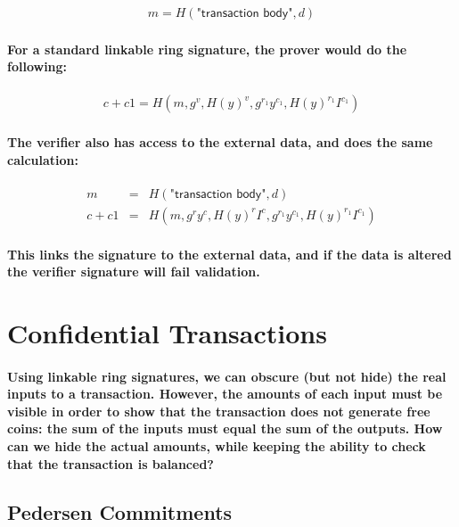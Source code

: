 \documentclass{article}
\begin{document}
\begin{eqnarray}
  m = H(\textsf{"transaction body"}, d)
\end{eqnarray}

\paragraph{For a standard linkable ring signature, the prover would do the following:}

\begin{eqnarray}
  c + c1 = H(m, g^v, H(y)^v, g^{r_1} y^{c_1}, H(y)^{r_1} I^{c_1})
\end{eqnarray}

\paragraph{The verifier also has access to the external data, and does the same calculation:}

\begin{eqnarray}
  m &=& H(\textsf{"transaction body"}, d)\\
  c+c1 &=& H(m, g^r y^c, H(y)^r I^c, g^{r_1} y^{c_1}, H(y)^{r_1} I^{c_1})
\end{eqnarray}

\paragraph{This links the signature to the external data, and if the data is altered the verifier signature will fail validation.}



\section{Confidential Transactions}

\paragraph{Using linkable ring signatures, we can obscure (but not hide) the real inputs to a transaction.  However, the amounts of each input must be visible in order to show that the transaction does not generate free coins: the sum of the inputs must equal the sum of the outputs.  How can we hide the actual amounts, while keeping the ability to check that the transaction is balanced?}


\subsection{Pedersen Commitments}
\end{document}
